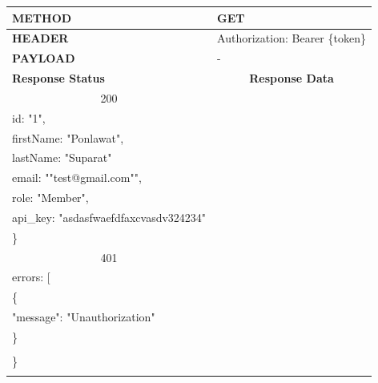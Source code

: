 \documentclass[12pt,oneside,openright,a4paper]{cpe-thai-project}
\begin{document}
\begin{itemize}
\begin{longtable}[!ht]{p{3cm}|p{8cm}}
    \textbf{METHOD}           & GET                                                                                                                 \\ \hline
    \textbf{HEADER}           & Authorization: Bearer \{token\}                                                                                       \\ \hline 
    \textbf{PAYLOAD}          & -                                                                                                                   \\ \hline \newpage \hline 
    \textbf{Response Status}  & \multicolumn{1}{c}{\textbf{Response Data}}                                                                          \\ \hline
    \multicolumn{1}{c|}{200}  & \begin{tabular}[c]{@{}l@{}}\{\\ \quad id: "1",\\ \quad firstName: "Ponlawat",\\ \quad lastName: "Suparat" \\
      \quad email: ""test@gmail.com"",\\ \quad role: "Member",\\ \quad api\_key: "asdasfwaefdfaxcvasdv324234"\\\}\end{tabular}           \\ \hline
    \multicolumn{1}{c|}{401}  &
    \begin{tabular}[c]{@{}l@{}}\{\\ \quad errors: {[}\\ \quad\quad\{\\ \quad\quad\quad "message": "Unauthorization"\\ \quad\quad \}\\ \quad{]}\\\}\end{tabular}                                                                         \\ \hline
    \hhline{==}
\end{longtable}


\end{itemize}
\end{document}
